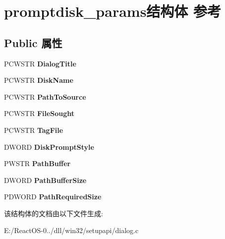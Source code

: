 \hypertarget{structpromptdisk__params}{}\section{promptdisk\+\_\+params结构体 参考}
\label{structpromptdisk__params}
\subsection*{Public 属性}
\begin{DoxyCompactItemize}
\item 
\mbox{\label{structpromptdisk__params_a9ff32752d522ca962f6c2ece3e68cd2f}} 
P\+C\+W\+S\+TR {\bfseries Dialog\+Title}
\item 
\mbox{\label{structpromptdisk__params_ae2f529a89b3505e3315c432894c17253}} 
P\+C\+W\+S\+TR {\bfseries Disk\+Name}
\item 
\mbox{\label{structpromptdisk__params_aff1e2fd226570de62f2ca8d5fa49dc05}} 
P\+C\+W\+S\+TR {\bfseries Path\+To\+Source}
\item 
\mbox{\label{structpromptdisk__params_ab5c6776be3dedc8d21f3fb7d3039774d}} 
P\+C\+W\+S\+TR {\bfseries File\+Sought}
\item 
\mbox{\label{structpromptdisk__params_a379060fb0ad35dee748cfbe7af792c31}} 
P\+C\+W\+S\+TR {\bfseries Tag\+File}
\item 
\mbox{\label{structpromptdisk__params_a00d7b6adada1e8db8863a5a425acc4a5}} 
D\+W\+O\+RD {\bfseries Disk\+Prompt\+Style}
\item 
\mbox{\label{structpromptdisk__params_af5d10c9818cc276c305aa6aa93c0efac}} 
P\+W\+S\+TR {\bfseries Path\+Buffer}
\item 
\mbox{\label{structpromptdisk__params_a24306f2aa2a6e22d5f5e09b232e5db94}} 
D\+W\+O\+RD {\bfseries Path\+Buffer\+Size}
\item 
\mbox{\label{structpromptdisk__params_a3c780a7e1a50ddb5f676389935157c78}} 
P\+D\+W\+O\+RD {\bfseries Path\+Required\+Size}
\end{DoxyCompactItemize}


该结构体的文档由以下文件生成\+:\begin{DoxyCompactItemize}
\item 
E\+:/\+React\+O\+S-\/0../dll/win32/setupapi/dialog.\+c\end{DoxyCompactItemize}
